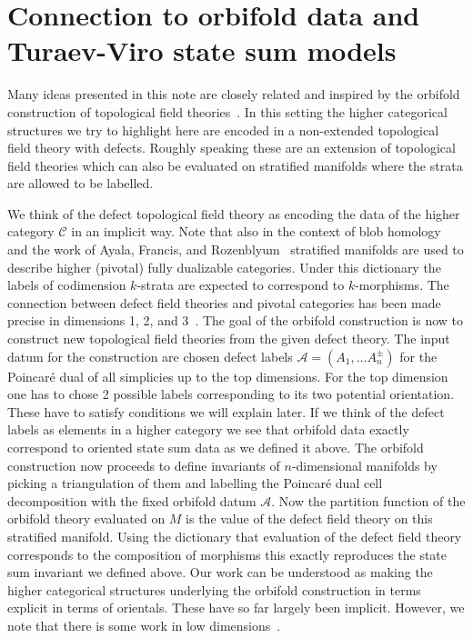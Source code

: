 \section{Connection to orbifold data and Turaev-Viro state sum models} 
Many ideas presented in this note are closely related and inspired by the orbifold construction of topological field theories~\cite{carqueville2019orbifolds}. In this setting the higher categorical structures we try to highlight here are encoded in a non-extended topological field theory with defects. Roughly speaking these are an extension of topological field theories which can also be evaluated on stratified manifolds where the strata are allowed to be labelled.  

We think of the defect topological field theory as encoding the data of the higher category $\mathcal{C}$ in an implicit way. Note that also in the context of blob homology~\cite{blob} and the work of Ayala, Francis, and Rozenblyum~\cite{Ayala2015ASH} stratified manifolds are used to describe higher (pivotal) fully dualizable categories.   
Under this dictionary the labels of codimension $k$-strata are expected to correspond to $k$-morphisms. 
The connection between defect field theories and pivotal categories has been made precise in dimensions 1, 2, and 3~\cite{Davydov:2011kb,CARQUEVILLE2020107024}. 
The goal of the orbifold construction is now to construct new topological field theories from the given defect theory. 
The input datum for the construction are chosen defect labels $\mathcal{A}=(A_1,\dots A_n^{\pm})$ for the Poincaré dual of all simplicies up to the top dimensions. 
For the top dimension one has to chose 2 possible labels corresponding to its two potential orientation. 
These have to satisfy conditions we will explain later. 
If we think of the defect labels as elements in a higher category we see that orbifold data exactly correspond to oriented state sum data as we defined it above. 
The orbifold construction now proceeds to define invariants of $n$-dimensional manifolds by picking a triangulation of them and labelling the Poincaré dual cell decomposition with the fixed orbifold datum $\mathcal{A}$. 
Now the partition function of the orbifold theory evaluated on $M$ is the value of the defect field theory on this stratified manifold. 
Using the dictionary that evaluation of the defect field theory corresponds to the composition of morphisms this exactly reproduces the state sum invariant we defined above. 
Our work can be understood as making the higher categorical structures underlying the orbifold construction in terms explicit in terms of orientals. 
These have so far largely been implicit. 
However, we note that there is some work in low dimensions~\cite{carqueville2016orbifoldcompletion,3DOrb}.    

